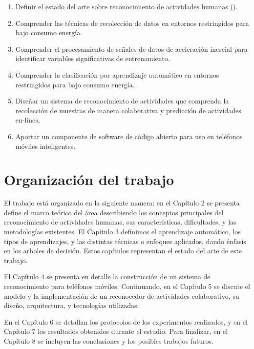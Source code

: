 \label{objetivos-especuxedficos}
\begin{enumerate}
\item \label{enu:obe1}Definir el estado del arte sobre reconocimiento de
actividades humanas (). 
\item \label{enu:obe2}Comprender las técnicas de recolección de datos en
entornos restringidos para bajo consumo energía. 
\item \label{enu:obe3}Comprender el procesamiento de señales de datos de
aceleración inercial para identificar variables significativas de
entrenamiento. 
\item \label{enu:obe4}Comprender la clasificación por aprendizaje automático
en entornos restringidos para bajo consumo energía. 
\item \label{enu:obe5}Diseñar un sistema de reconocimiento de actividades
que comprenda la recolección de muestras de manera colaborativa y
predicción de actividades en-línea. 
\item \label{enu:obe6}Aportar un componente de software de código abierto
para uso en teléfonos móviles inteligentes. 
\end{enumerate}

\section{Organización del trabajo}

\label{organizaciuxf3n-del-trabajo}

El trabajo está organizado en la siguiente manera: en el Capítulo
2 se presenta define el marco teórico del área describiendo los conceptos
principales del reconocimiento de actividades humanas, sus características,
dificultades, y las metodologías existentes. El Capítulo 3 definimos
el aprendizaje automático, los tipos de aprendizajes, y las distintas
técnicas o enfoques aplicados, dando énfasis en los arboles de decisión.
Estos capítulos representan el estado del arte de este trabajo.

El Capítulo 4 se presenta en detalle la construcción de un sistema
de reconocimiento para teléfonos móviles. Continuando, en el Capítulo
5 se discute el modelo y la implementación de un reconocedor de actividades
colaborativo, su diseño, arquitectura, y tecnologías utilizadas.

En el Capítulo 6 se detallan los protocolos de los experimentos realizados,
y en el Capítulo 7 los resultados obtenidos durante el estudio. Para
finalizar, en el Capítulo 8 se incluyen las conclusiones y los posibles
trabajos futuros. 
